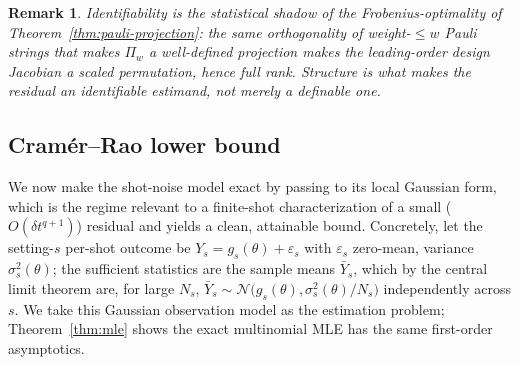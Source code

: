 \documentclass[aps,prresearch,reprint,superscriptaddress,nofootinbib,amsmath,amssymb]{revtex4-2}
\newcommand{\dt}{\delta t}
\newtheorem{remark}{Remark}
\begin{document}
\begin{remark}
Identifiability is the statistical shadow of the Frobenius-optimality of Theorem~\ref{thm:pauli-projection}: the same orthogonality of weight-$\leq w$ Pauli strings that makes $\Pi_w$ a well-defined projection makes the leading-order design Jacobian a scaled permutation, hence full rank. Structure is what makes the residual an \emph{identifiable} estimand, not merely a definable one.
\end{remark}

\subsection{Cram\'er--Rao lower bound}
\label{app:inference-crb}

We now make the shot-noise model exact by passing to its local Gaussian form, which is the regime relevant to a finite-shot characterization of a small ($O(\dt^{q+1})$) residual and yields a clean, attainable bound. Concretely, let the setting-$s$ per-shot outcome be $Y_{s}=g_s(\theta)+\varepsilon_s$ with $\varepsilon_s$ zero-mean, variance $\sigma_s^2(\theta)$; the sufficient statistics are the sample means $\bar Y_s$, which by the central limit theorem are, for large $N_s$, $\bar Y_s\sim\mathcal{N}\!\bigl(g_s(\theta),\sigma_s^2(\theta)/N_s\bigr)$ independently across $s$. We take this Gaussian observation model as the estimation problem; Theorem~\ref{thm:mle} shows the exact multinomial MLE has the same first-order asymptotics.
\end{document}
